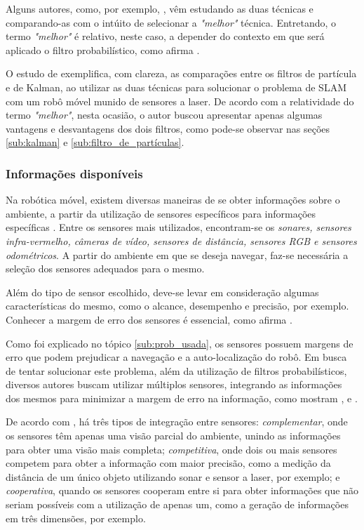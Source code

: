 			Alguns autores, como, por exemplo, \cite{comparacaoKalmanParticulas}, vêm estudando as duas técnicas e comparando-as com o intúito de selecionar a \textit{"melhor"} técnica. Entretando, o termo \textit{"melhor"} é relativo, neste caso, a depender do contexto em que será aplicado o filtro probabilístico, como afirma \cite{comparacaoKalmanParticulas}.

			O estudo de \cite{comparacaoKalmanParticulas} exemplifica, com clareza, as comparações entre os filtros de partícula e de Kalman, ao utilizar as duas técnicas para solucionar o problema de SLAM com um robô móvel munido de sensores a laser. De acordo com a relatividade do termo \textit{"melhor"}, nesta ocasião, o autor buscou apresentar apenas algumas vantagens e desvantagens dos dois filtros, como pode-se observar nas seções \ref{sub:kalman} e \ref{sub:filtro_de_partículas}.

		\subsubsection{Informações disponíveis}
		\label{sub:infos_disponiveis}

			Na robótica móvel, existem diversas maneiras de se obter informações sobre o ambiente, a partir da utilização de sensores específicos para informações específicas \cite{interacaoRoboAmbiente}. Entre os sensores mais utilizados, encontram-se os \textit{sonares, sensores infra-vermelho, câmeras de vídeo, sensores de distância, sensores RGB e sensores odométricos}. A partir do ambiente em que se deseja navegar, faz-se necessária a seleção dos sensores adequados para o mesmo.

			Além do tipo de sensor escolhido, deve-se levar em consideração algumas características do mesmo, como o alcance, desempenho e precisão, por exemplo. Conhecer a margem de erro dos sensores é essencial, como afirma \cite{wall_following}.

			Como foi explicado no tópico \ref{sub:prob_usada}, os sensores possuem margens de erro que podem prejudicar a navegação e a auto-localização do robô. Em busca de tentar solucionar este problema, além da utilização de filtros probabilísticos, diversos autores buscam utilizar múltiplos sensores, integrando as informações dos mesmos para minimizar a margem de erro na informação, como mostram \cite{fusingSensorsParallel}, \cite{neuralNetwork} e \cite{slamProblem}.

			De acordo com \cite{agenteExploratorioKalman}, há três tipos de integração entre sensores: \textit{complementar}, onde os sensores têm apenas uma visão parcial do ambiente, unindo as informações para obter uma visão mais completa; \textit{competitiva}, onde dois ou mais sensores competem para obter a informação com maior precisão, como a medição da distância de um único objeto utilizando sonar e sensor a laser, por exemplo; e \textit{cooperativa}, quando os sensores cooperam entre si para obter informações que não seriam possíveis com a utilização de apenas um, como a geração de informações em três dimensões, por exemplo.


